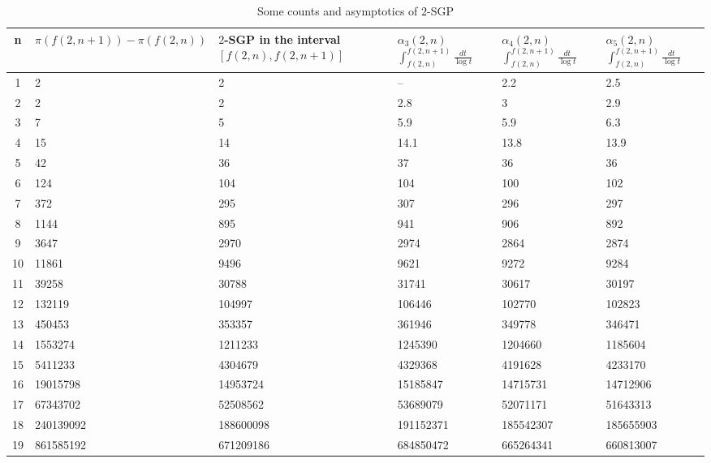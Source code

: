 \documentclass{amsart}
\numberwithin{equation}{section}
\begin{document}
\begin{table}[!h]
	\centering
	\begin{tabularx}{\linewidth}{|c|X|X|X|X|X|}
		\hline
		n & $\pi(f(2,n+1))-\pi(f(2,n))$ & $2$-SGP in the interval $[f(2,n), f(2,n+1)]$ & $\alpha_3(2,n)$ $\int_{f(2,n)}^{f(2,n+1)} \frac{dt}{\log t}$ & $\alpha_4(2,n)$ $\int_{f(2,n)}^{f(2,n+1)} \frac{dt}{\log t}$ & $\alpha_5(2,n)$ $\int_{f(2,n)}^{f(2,n+1)} \frac{dt}{\log t}$ \\
		\hline
		1 & 2 & 2 & -- & 2.2 & 2.5 \\
		\hline
		2 & 2 & 2 & 2.8 & 3 & 2.9 \\
		\hline
		3 & 7 & 5 & 5.9 & 5.9 & 6.3 \\
		\hline
		4 & 15 & 14 & 14.1 & 13.8 & 13.9 \\
		\hline
		5 & 42 & 36 & 37 & 36 & 36 \\
		\hline
		6 & 124 & 104 & 104 & 100 & 102 \\
		\hline
		7 & 372 & 295 & 307 & 296 & 297 \\
		\hline
		8 & 1144 & 895 & 941 & 906 & 892 \\
		\hline
		9 & 3647 & 2970 & 2974 & 2864 & 2874 \\
		\hline
		10 & 11861 & 9496 & 9621 & 9272 & 9284 \\
		\hline
		11 & 39258 & 30788 & 31741 & 30617 & 30197 \\
		\hline
		12 & 132119 & 104997 & 106446 & 102770 & 102823 \\
		\hline
		13 & 450453 & 353357 & 361946 & 349778 & 346471 \\
		\hline
		14 & 1553274 & 1211233 & 1245390 & 1204660 & 1185604 \\
		\hline
		15 & 5411233 & 4304679 & 4329368 & 4191628 & 4233170 \\
		\hline
		16 & 19015798 & 14953724 & 15185847 & 14715731 & 14712906 \\
		\hline 
		17 & 67343702 & 52508562 & 53689079 & 52071171 & 51643313 \\
		\hline
		18 & 240139092 & 188600098 & 191152371 & 185542307 & 185655903 \\
		\hline
		19 & 861585192 & 671209186 & 684850472 & 665264341 & 660813007 \\
		\hline
	\end{tabularx}%
	\caption{Some counts and asymptotics of $2$-SGP}
	\label{estimates1}
\end{table} 
\end{document}
